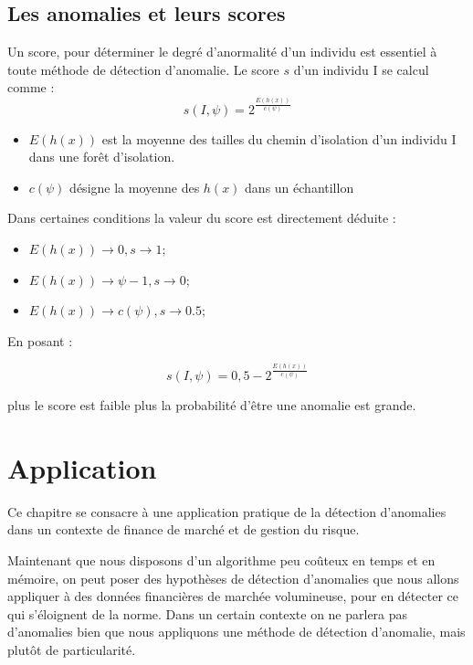 \section{Les anomalies et leurs scores}

Un score, pour déterminer le degré d'anormalité d'un individu est essentiel à toute méthode de détection d'anomalie.
Le score $s$ d'un individu I se calcul comme :
\begin{equation}
    s(I,\psi)=2^\frac{E(h(x))}{c(\psi)}
\end{equation}

\begin{itemize}
    \item $E(h(x))$ est la moyenne des tailles du chemin d'isolation d'un individu I dans une forêt d'isolation.
    \item $c(\psi)$ désigne la moyenne des $h(x)$ dans un échantillon
\end{itemize}

Dans certaines conditions la valeur du score est directement déduite :
\begin{itemize}
    \item $E(h(x)) \rightarrow 0,  s \rightarrow 1;$
    \item $E(h(x)) \rightarrow \psi-1,  s \rightarrow 0; $
    \item $E(h(x)) \rightarrow c(\psi),  s \rightarrow 0.5;$
\end{itemize}

En posant :

\begin{equation}
    s(I,\psi)=0,5 - 2^\frac{E(h(x))}{c(\psi)}
\end{equation}

plus le score est faible plus la probabilité d'être une anomalie est grande.

\chapter{Application}

Ce chapitre se consacre à une application pratique de la détection d'anomalies dans un contexte de finance de marché et de gestion du risque. 

Maintenant que nous disposons d'un algorithme peu coûteux en temps et en mémoire, on peut poser des hypothèses de détection d'anomalies que nous allons appliquer à des données financières de marchée volumineuse, pour en détecter ce qui s'éloignent de la norme. Dans un certain contexte on ne parlera pas d'anomalies bien que nous appliquons une méthode de détection d'anomalie, mais plutôt de particularité.

